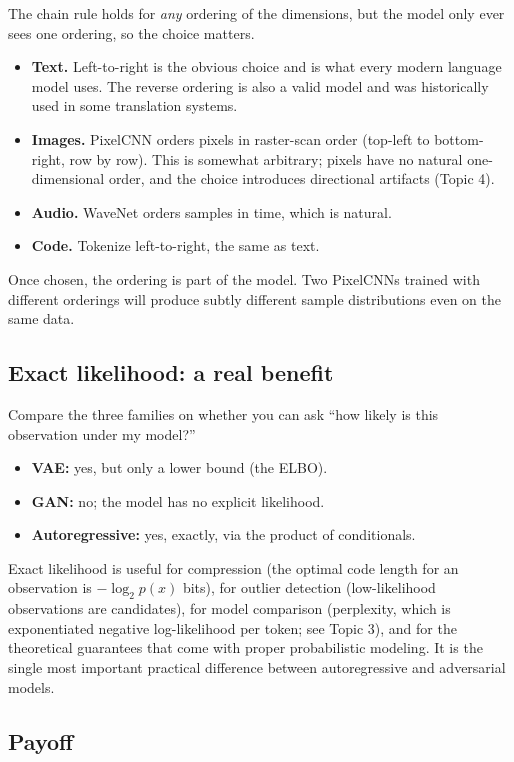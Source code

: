 \documentclass[11pt]{article}
\theoremstyle{remark}
\begin{document}
The chain rule holds for \emph{any} ordering of the dimensions, but the model only ever sees one ordering, so the choice matters.
\begin{itemize}
\item \textbf{Text.} Left-to-right is the obvious choice and is what every modern language model uses. The reverse ordering is also a valid model and was historically used in some translation systems.
\item \textbf{Images.} PixelCNN orders pixels in raster-scan order (top-left to bottom-right, row by row). This is somewhat arbitrary; pixels have no natural one-dimensional order, and the choice introduces directional artifacts (Topic 4).
\item \textbf{Audio.} WaveNet orders samples in time, which is natural.
\item \textbf{Code.} Tokenize left-to-right, the same as text.
\end{itemize}
Once chosen, the ordering is part of the model. Two PixelCNNs trained with different orderings will produce subtly different sample distributions even on the same data.

\subsection{Exact likelihood: a real benefit}

Compare the three families on whether you can ask ``how likely is this observation under my model?''
\begin{itemize}
\item \textbf{VAE:} yes, but only a lower bound (the ELBO).
\item \textbf{GAN:} no; the model has no explicit likelihood.
\item \textbf{Autoregressive:} yes, exactly, via the product of conditionals.
\end{itemize}
Exact likelihood is useful for compression (the optimal code length for an observation is $-\log_2 p(x)$ bits), for outlier detection (low-likelihood observations are candidates), for model comparison (perplexity, which is exponentiated negative log-likelihood per token; see Topic 3), and for the theoretical guarantees that come with proper probabilistic modeling. It is the single most important practical difference between autoregressive and adversarial models.

\subsection{Payoff}
\end{document}

